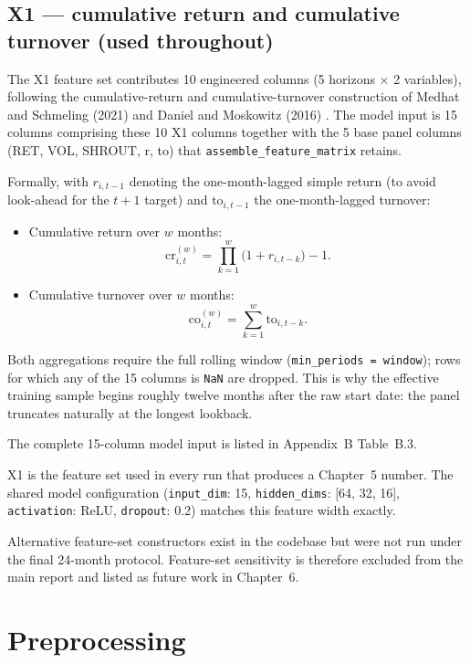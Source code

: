 \subsection{X1 --- cumulative return and cumulative turnover (used throughout)}\label{subsec:x1}

The X1 feature set contributes 10 engineered columns (5 horizons $\times$ 2 variables), following the cumulative-return and cumulative-turnover construction of Medhat and Schmeling (2021) \cite{ref11} and Daniel and Moskowitz (2016) \cite{ref3}. The model input is 15 columns comprising these 10 X1 columns together with the 5 base panel columns (RET, VOL, SHROUT, r, to) that \texttt{assemble\_feature\_matrix} retains.

Formally, with $r_{i,t-1}$ denoting the one-month-lagged simple return (to avoid look-ahead for the $t+1$ target) and $\text{to}_{i,t-1}$ the one-month-lagged turnover:

\begin{itemize}
 \item Cumulative return over $w$ months:
 \[
 \mathrm{cr}^{(w)}_{i,t} = \prod_{k=1}^{w} \big(1 + r_{i,t-k}\big) - 1.
 \]
 \item Cumulative turnover over $w$ months:
 \[
 \mathrm{co}^{(w)}_{i,t} = \sum_{k=1}^{w} \text{to}_{i,t-k}.
 \]
\end{itemize}

Both aggregations require the full rolling window (\texttt{min\_periods = window}); rows for which any of the 15 columns is \texttt{NaN} are dropped. This is why the effective training sample begins roughly twelve months after the raw start date: the panel truncates naturally at the longest lookback.

The complete 15-column model input is listed in Appendix~B Table~B.3.

X1 is the feature set used in every run that produces a Chapter~5 number. The shared model configuration (\texttt{input\_dim}: 15, \texttt{hidden\_dims}: [64, 32, 16], \texttt{activation}: ReLU, \texttt{dropout}: 0.2) matches this feature width exactly.

Alternative feature-set constructors exist in the codebase but were not run under the final 24-month protocol. Feature-set sensitivity is therefore excluded from the main report and listed as future work in Chapter~6.

\section{Preprocessing}\label{sec:preprocessing}

